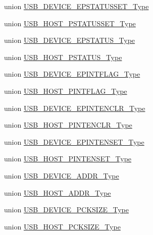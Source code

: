 \begin{DoxyCompactItemize}
\item 
union \hyperlink{union_u_s_b___d_e_v_i_c_e___e_p_s_t_a_t_u_s_s_e_t___type}{U\+S\+B\+\_\+\+D\+E\+V\+I\+C\+E\+\_\+\+E\+P\+S\+T\+A\+T\+U\+S\+S\+E\+T\+\_\+\+Type}
\item 
union \hyperlink{union_u_s_b___h_o_s_t___p_s_t_a_t_u_s_s_e_t___type}{U\+S\+B\+\_\+\+H\+O\+S\+T\+\_\+\+P\+S\+T\+A\+T\+U\+S\+S\+E\+T\+\_\+\+Type}
\item 
union \hyperlink{union_u_s_b___d_e_v_i_c_e___e_p_s_t_a_t_u_s___type}{U\+S\+B\+\_\+\+D\+E\+V\+I\+C\+E\+\_\+\+E\+P\+S\+T\+A\+T\+U\+S\+\_\+\+Type}
\item 
union \hyperlink{union_u_s_b___h_o_s_t___p_s_t_a_t_u_s___type}{U\+S\+B\+\_\+\+H\+O\+S\+T\+\_\+\+P\+S\+T\+A\+T\+U\+S\+\_\+\+Type}
\item 
union \hyperlink{union_u_s_b___d_e_v_i_c_e___e_p_i_n_t_f_l_a_g___type}{U\+S\+B\+\_\+\+D\+E\+V\+I\+C\+E\+\_\+\+E\+P\+I\+N\+T\+F\+L\+A\+G\+\_\+\+Type}
\item 
union \hyperlink{union_u_s_b___h_o_s_t___p_i_n_t_f_l_a_g___type}{U\+S\+B\+\_\+\+H\+O\+S\+T\+\_\+\+P\+I\+N\+T\+F\+L\+A\+G\+\_\+\+Type}
\item 
union \hyperlink{union_u_s_b___d_e_v_i_c_e___e_p_i_n_t_e_n_c_l_r___type}{U\+S\+B\+\_\+\+D\+E\+V\+I\+C\+E\+\_\+\+E\+P\+I\+N\+T\+E\+N\+C\+L\+R\+\_\+\+Type}
\item 
union \hyperlink{union_u_s_b___h_o_s_t___p_i_n_t_e_n_c_l_r___type}{U\+S\+B\+\_\+\+H\+O\+S\+T\+\_\+\+P\+I\+N\+T\+E\+N\+C\+L\+R\+\_\+\+Type}
\item 
union \hyperlink{union_u_s_b___d_e_v_i_c_e___e_p_i_n_t_e_n_s_e_t___type}{U\+S\+B\+\_\+\+D\+E\+V\+I\+C\+E\+\_\+\+E\+P\+I\+N\+T\+E\+N\+S\+E\+T\+\_\+\+Type}
\item 
union \hyperlink{union_u_s_b___h_o_s_t___p_i_n_t_e_n_s_e_t___type}{U\+S\+B\+\_\+\+H\+O\+S\+T\+\_\+\+P\+I\+N\+T\+E\+N\+S\+E\+T\+\_\+\+Type}
\item 
union \hyperlink{union_u_s_b___d_e_v_i_c_e___a_d_d_r___type}{U\+S\+B\+\_\+\+D\+E\+V\+I\+C\+E\+\_\+\+A\+D\+D\+R\+\_\+\+Type}
\item 
union \hyperlink{union_u_s_b___h_o_s_t___a_d_d_r___type}{U\+S\+B\+\_\+\+H\+O\+S\+T\+\_\+\+A\+D\+D\+R\+\_\+\+Type}
\item 
union \hyperlink{union_u_s_b___d_e_v_i_c_e___p_c_k_s_i_z_e___type}{U\+S\+B\+\_\+\+D\+E\+V\+I\+C\+E\+\_\+\+P\+C\+K\+S\+I\+Z\+E\+\_\+\+Type}
\item 
union \hyperlink{union_u_s_b___h_o_s_t___p_c_k_s_i_z_e___type}{U\+S\+B\+\_\+\+H\+O\+S\+T\+\_\+\+P\+C\+K\+S\+I\+Z\+E\+\_\+\+Type}

\end{DoxyCompactItemize}
